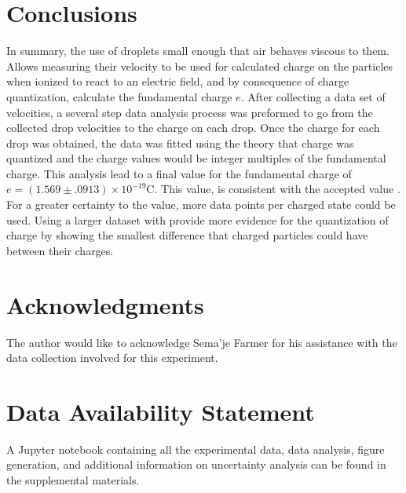 \documentclass[%
 reprint,
 amsmath,amssymb,
 aps,
]{revtex4-2}
\begin{document}
\section{Conclusions}
In summary, the use of droplets small enough that air behaves viscous to them. Allows measuring their velocity to be used for calculated charge on the particles when ionized to react to an electric field, and by consequence of charge quantization, calculate the fundamental charge $e$. After collecting a data set of velocities, a several step data analysis process was preformed to go from the collected drop velocities to the charge on each drop. Once the charge for each drop was obtained, the data was fitted using the theory that charge was quantized and the charge values would be integer multiples of the fundamental charge. This analysis lead to a final value for the fundamental charge of  $e = (1.569 \pm .0913) \times 10^{-19} \text{C}$. This value, is consistent with the accepted value .
For a greater certainty to the value, more data points per charged state could be used. Using a larger dataset with provide more evidence for the quantization of charge by showing the smallest difference that charged particles could have between their charges. 


\section*{Acknowledgments}
The author would like to acknowledge Sema'je Farmer for his assistance with the data collection involved for this experiment. 

\section*{Data Availability Statement}
A Jupyter notebook containing all the experimental data, data analysis, figure generation, and additional information on uncertainty analysis can be found in the supplemental materials. \cite{supp}

\end{document}
